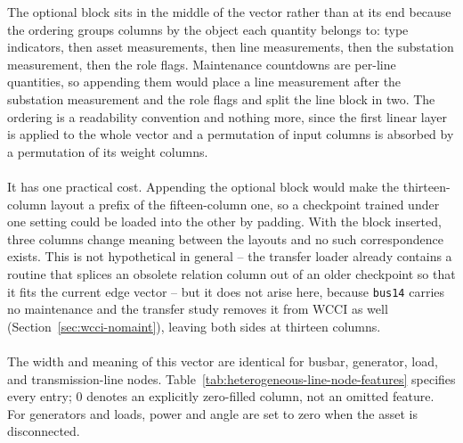 {\color{clarif}
\noindent The optional block sits in the middle of the vector rather than at its
end because the ordering groups columns by the object each quantity belongs to:
type indicators, then asset measurements, then line measurements, then the
substation measurement, then the role flags. Maintenance countdowns are per-line
quantities, so appending them would place a line measurement after the
substation measurement and the role flags and split the line block in two. The
ordering is a readability convention and nothing more, since the first linear
layer is applied to the whole vector and a permutation of input columns is
absorbed by a permutation of its weight columns.
\\
\\
It has one practical cost. Appending the optional block would make the
thirteen-column layout a prefix of the fifteen-column one, so a checkpoint
trained under one setting could be loaded into the other by padding. With the
block inserted, three columns change meaning between the layouts and no such
correspondence exists. This is not hypothetical in general -- the transfer
loader already contains a routine that splices an obsolete relation column out
of an older checkpoint so that it fits the current edge vector -- but it does
not arise here, because \texttt{bus14} carries no maintenance and the transfer
study removes it from WCCI as well (Section~\ref{sec:wcci-nomaint}), leaving
both sides at thirteen columns.
}
\\
\\
The width and meaning of this vector are identical for busbar, generator, load, and
transmission-line nodes. Table~\ref{tab:heterogeneous-line-node-features}
specifies every entry; \(0\) denotes an explicitly zero-filled column, not an
omitted feature. For generators and loads, power and angle are set to zero when
the asset is disconnected.

